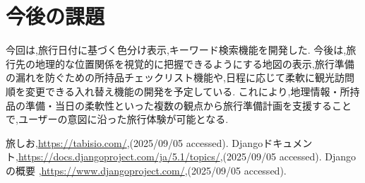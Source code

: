 \documentclass[a4j,twocolumn]{jsarticle}
\begin{document}
\section{今後の課題}
\label{sec:org2988542}
今回は,旅行日付に基づく色分け表示,キーワード検索機能を開発した.
今後は,旅行先の地理的な位置関係を視覚的に把握できるようにする地図の表示,旅行準備の漏れを防ぐための所持品チェックリスト機能や,日程に応じて柔軟に観光訪問順を変更できる入れ替え機能の開発を予定している.
これにより,地理情報・所持品の準備・当日の柔軟性といった複数の観点から旅行準備計画を支援することで,ユーザーの意図に沿った旅行体験が可能となる.



\small\setlength\baselineskip{10pt}
\begin{thebibliography}{9}

 旅しお,\url{https://tabisio.com/},(2025/09/05 accessed).
Djangoドキュメント,\url{https://docs.djangoproject.com/ja/5.1/topics/},(2025/09/05 accessed).
Djangoの概要 ,\url{https://www.djangoproject.com/},(2025/09/05 accessed).
\end{thebibliography}
\end{document}
